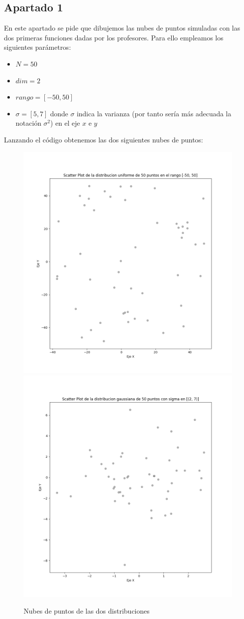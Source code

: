 \documentclass[11pt]{article}
\begin{document}
\subsection{Apartado 1}

En este apartado se pide que dibujemos las nubes de puntos simuladas con las dos primeras funciones dadas por los profesores. Para ello empleamos los siguientes parámetros:

\begin{itemize}
    \item $N = 50$
    \item $dim = 2$
    \item $rango = [-50, 50]$
    \item $\sigma = [5, 7]$ donde $\sigma$ indica la varianza (por tanto sería más adecuada la notación $\sigma^2$) en el eje $x$ e $y$
\end{itemize}

Lanzando el código obtenemos las dos siguientes nubes de puntos:

\begin{figure}[h]
    \includegraphics[width=0.60 \textwidth]{nube_puntos_uniforme}
    \includegraphics[width=0.60 \textwidth]{nube_puntos_normal}
    \caption{Nubes de puntos de las dos distribuciones}
\end{figure}
\end{document}
